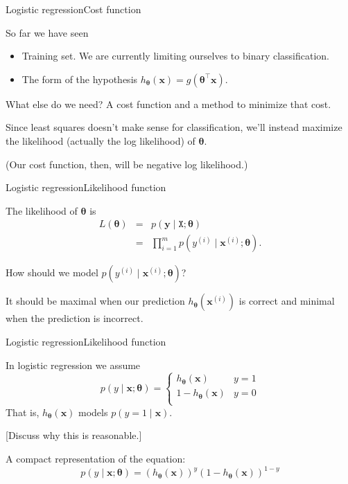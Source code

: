 \documentclass{beamer}
\renewcommand{\vec}[1]{\boldsymbol{#1}}
\newcommand{\mat}[1]{\mathtt{#1}}
\begin{document}
\begin{frame}{Logistic regression}{Cost function}

  So far we have seen
  \begin{itemize}
  \item Training set. We are currently limiting ourselves to \alert{binary} classification.
  \item The form of the hypothesis $h_{\vec{\theta}}(\vec{x}) = g(\vec{\theta}^\top \vec{x})$.
  \end{itemize}

  What else do we need? A cost function and a method to minimize that cost.

  \medskip

  Since least squares doesn't make sense for classification, we'll
  instead \alert{maximize the likelihood} (actually the log likelihood)
  of $\vec{\theta}$.

  \medskip

  (Our cost function, then, will be negative log likelihood.)
  
\end{frame}


\begin{frame}{Logistic regression}{Likelihood function}

  The likelihood of $\vec{\theta}$ is
  \begin{eqnarray}
    L(\vec{\theta}) & = & p(\vec{y} \mid \mat{X} ; \vec{\theta}) \nonumber \\
    & = & \prod_{i=1}^m p(y^{(i)} \mid \vec{x}^{(i)} ; \vec{\theta}) .\nonumber
  \end{eqnarray}

  How should we model $p(y^{(i)} \mid \vec{x}^{(i)} ; \vec{\theta})$?

  \medskip

  It should be \alert{maximal} when our prediction
  $h_{\vec{\theta}}(\vec{x}^{(i)})$ is \alert{correct} and
  \alert{minimal} when the prediction is \alert{incorrect}.

\end{frame}


\begin{frame}{Logistic regression}{Likelihood function}

  In logistic regression we assume
  \[ p(y \mid \vec{x} ; \vec{\theta}) = \begin{cases}
    h_{\vec{\theta}}(\vec{x}) & y=1 \\
    1-h_{\vec{\theta}}(\vec{x}) & y=0 \\    
  \end{cases} \]
  That is, $h_{\vec{\theta}}(\vec{x})$ models $p(y=1 \mid \vec{x})$.

  \medskip

  [Discuss why this is reasonable.]

  \medskip

  A compact representation of the equation:
  \[ p(y \mid \vec{x} ; \vec{\theta}) = (h_{\vec{\theta}}(\vec{x}))^y(1-h_{\vec{\theta}}(\vec{x}))^{1-y} \]

\end{frame}
\end{document}

